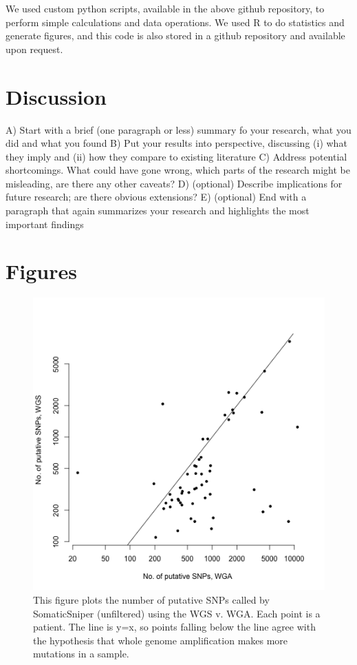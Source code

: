 \documentclass[11pt]{article} %
\begin{document}
We used custom python scripts, available in the above github repository, to perform simple calculations and data operations. We used R \cite{Rsoftware} to do statistics and generate figures, and this code is also stored in a github repository and available upon request.  

\section{Discussion}

A) Start with a brief (one paragraph or less) summary fo your research, what you did and what you found
B) Put your results into perspective, discussing (i) what they imply and (ii) how they compare to existing literature
C) Address potential shortcomings. What could have gone wrong, which parts of the research might be misleading, are there any other caveats?
D) (optional) Describe implications for future research; are there obvious extensions?
E) (optional) End with a paragraph that again summarizes your research and highlights the most important findings

\section{Figures}

\begin{figure}
\includegraphics[scale=1.0]{C282_v_C484.png}
\caption{This figure plots the number of putative SNPs called by SomaticSniper (unfiltered) using the WGS v. WGA. Each point is a patient. The line is y=x, so points falling below the line agree with the hypothesis that whole genome amplification makes more mutations in a sample.}
\end{figure}
\end{document}
